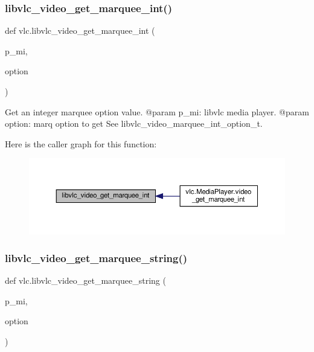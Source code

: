 \subsubsection{\texorpdfstring{libvlc\+\_\+video\+\_\+get\+\_\+marquee\+\_\+int()}{libvlc\_video\_get\_marquee\_int()}}
{\footnotesize\ttfamily def vlc.\+libvlc\+\_\+video\+\_\+get\+\_\+marquee\+\_\+int (\begin{DoxyParamCaption}\item[{}]{p\+\_\+mi,  }\item[{}]{option }\end{DoxyParamCaption})}

\begin{DoxyVerb}Get an integer marquee option value.
@param p_mi: libvlc media player.
@param option: marq option to get See libvlc_video_marquee_int_option_t.
\end{DoxyVerb}
 Here is the caller graph for this function\+:
\nopagebreak
\begin{figure}[H]
\begin{center}
\leavevmode
\includegraphics[width=350pt]{namespacevlc_a401766594b9c4244e6a0d82f41bb197d_icgraph}
\end{center}
\end{figure}
\mbox{\label{namespacevlc_ac9f15587fc7e277e517c65164b9bdf6f}} 
\subsubsection{\texorpdfstring{libvlc\+\_\+video\+\_\+get\+\_\+marquee\+\_\+string()}{libvlc\_video\_get\_marquee\_string()}}
{\footnotesize\ttfamily def vlc.\+libvlc\+\_\+video\+\_\+get\+\_\+marquee\+\_\+string (\begin{DoxyParamCaption}\item[{}]{p\+\_\+mi,  }\item[{}]{option }\end{DoxyParamCaption})}

